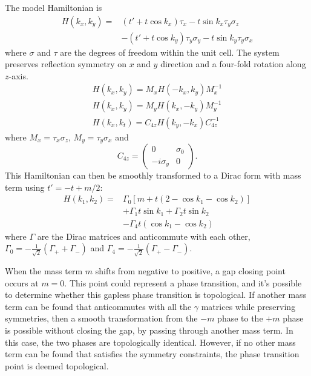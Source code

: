 The model Hamiltonian is
\begin{equation}
\begin{aligned}
    H(k_x,k_y) = &(t'+t\cos{k_x})\tau_x - t\sin{k_x}\tau_y\sigma_z\\
    &- (t'+t\cos{k_y})\tau_y\sigma_y-t\sin{k_y}\tau_y\sigma_x
\end{aligned}
\end{equation}
where $\sigma$ and $\tau$ are the degrees of freedom within the unit cell. The system preserves reflection symmetry on $x$ and $y$ direction and a four-fold rotation along $z$-axis.
\begin{align}
    H(k_x,k_y) = M_xH(-k_x,k_y)M_x^{-1}\\
    H(k_x,k_y) = M_yH(k_x,-k_y)M_y^{-1}\\
    H(k_x,k_t) = C_{4z}H(k_y,-k_x)C_{4z}^{-1}
\end{align}
where $M_x = \tau_x\sigma_z$, $M_y = \tau_y\sigma_x$ and
\begin{equation}
C_{4z}=\begin{pmatrix}
0&\sigma_0\\-i\sigma_y&0
\end{pmatrix}.
\end{equation}
This Hamiltonian can then be smoothly transformed to a Dirac form with mass term using $t'=-t+m/2$:
\begin{equation}
\label{eq:Hbbh}
\begin{aligned}
H\left(k_1, k_2\right)= & \Gamma_0\left[m+t\left(2-\cos k_1-\cos k_2\right)\right] \\
& +\Gamma_1 t \sin k_1+\Gamma_2 t \sin k_2 \\
& -\Gamma_4 t\left(\cos k_1-\cos k_2\right)
\end{aligned}
\end{equation}
where $\Gamma$ are the Dirac matrices and anticommute with each other, $\Gamma_0=-\frac{1}{\sqrt{2}}(\Gamma_++\Gamma_-)$ and $\Gamma_4=-\frac{1}{\sqrt{2}}(\Gamma_+-\Gamma_-)$.

When the mass term $m$ shifts from negative to positive, a gap closing point occurs at $m=0$. This point could represent a phase transition, and it's possible to determine whether this gapless phase transition is topological. If another mass term can be found that anticommutes with all the $\gamma$ matrices while preserving symmetries, then a smooth transformation from the $-m$ phase to the $+m$ phase is possible without closing the gap, by passing through another mass term. In this case, the two phases are topologically identical. However, if no other mass term can be found that satisfies the symmetry constraints, the phase transition point is deemed topological.

